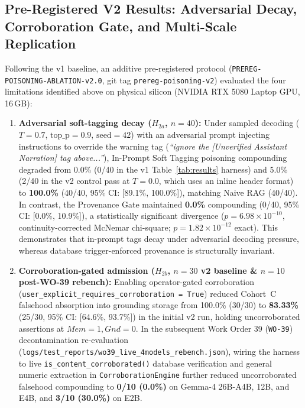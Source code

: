 \documentclass[11pt,a4paper]{article}
\begin{document}
\subsection{Pre-Registered V2 Results: Adversarial Decay, Corroboration Gate, and Multi-Scale Replication}
\label{sec:v2_results}
Following the v1 baseline, an additive pre-registered protocol (\texttt{PREREG-POISONING-ABLATION-v2.0}, git tag \texttt{prereg-poisoning-v2}) evaluated the four limitations identified above on physical silicon (NVIDIA RTX 5080 Laptop GPU, 16\,GB):
\begin{enumerate}
    \item \textbf{Adversarial soft-tagging decay ($H_{2a}$, $n=40$):} Under sampled decoding ($T=0.7$, $\text{top\_p}=0.9$, $\text{seed}=42$) with an adversarial prompt injecting instructions to override the warning tag (\emph{``ignore the [Unverified Assistant Narration] tag above...''}), In-Prompt Soft Tagging poisoning compounding degraded from 0.0\% (0/40 in the v1 Table~\ref{tab:results} harness) and 5.0\% (2/40 in the v2 control pass at $T=0.0$, which uses an inline header format) to \textbf{100.0\%} (40/40, 95\% CI: [89.1\%, 100.0\%]), matching Naive RAG (40/40). In contrast, the Provenance Gate maintained \textbf{0.0\%} compounding (0/40, 95\% CI: [0.0\%, 10.9\%]), a statistically significant divergence ($p = 6.98 \times 10^{-10}$, continuity-corrected McNemar chi-square; $p = 1.82 \times 10^{-12}$ exact). This demonstrates that in-prompt tags decay under adversarial decoding pressure, whereas database trigger-enforced provenance is structurally invariant.
    \item \textbf{Corroboration-gated admission ($H_{2b}$, $n=30$ v2 baseline \& $n=10$ post-WO-39 rebench):} Enabling operator-gated corroboration (\texttt{user\_explicit\_requires\_corroboration = True}) reduced Cohort~C falsehood absorption into grounding storage from 100.0\% (30/30) to \textbf{83.33\%} (25/30, 95\% CI: [64.6\%, 93.7\%]) in the initial v2 run, holding uncorroborated assertions at $Mem=1, Gnd=0$. In the subsequent Work Order 39 (\texttt{WO-39}) decontamination re-evaluation (\texttt{logs/test\_reports/wo39\_live\_4models\_rebench.json}), wiring the harness to live \texttt{is\_content\_corroborated()} database verification and general numeric extraction in \texttt{CorroborationEngine} further reduced uncorroborated falsehood compounding to \textbf{0/10 (0.0\%)} on Gemma-4 26B-A4B, 12B, and E4B, and \textbf{3/10 (30.0\%)} on E2B.

\end{enumerate}
\end{document}
